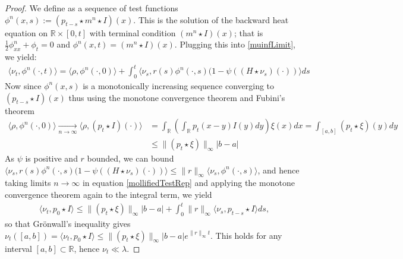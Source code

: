 \documentclass{article}
\newcommand{\B}[1]{\mathbb{#1}}
\begin{document}
\begin{proof}
    We define as a sequence of test functions $\phi^n(x,s):=(p_{t-s}\star m^n \star I)(x)$. This is the solution of the backward heat equation on $\B{R}\times [0,t]$ with terminal condition $(m^n\star I)(x)$; that is $\frac12\phi^n_{xx}+\phi_t=0$ and $\phi^n(x,t)=(m^n\star I)(x)$. Plugging this into \eqref{muinfLimit}, we yield:
    \begin{align}\label{mollifiedTestRep}
        \langle \nu_t,\phi^n(\cdot,t)\rangle = \langle \rho, \phi^n(\cdot,0)\rangle + \int_0^t \langle \nu_s, r(s)\phi^n(\cdot,s)(1-\psi((H\star \nu_s)(\cdot))\rangle ds
    \end{align}
    Now since $\phi^n(x,s)$ is a monotonically increasing sequence converging to $(p_{t-s}\star I)(x)$ thus %
    using the monotone convergence theorem and Fubini's theorem
    \begin{align*} \langle \rho, \phi^n(\cdot,0)\rangle \xrightarrow[n\to\infty]{} \langle \rho, (p_t \star I)(\cdot)\rangle &= \int_{\B{R}} \left(\int_{\B{R}} p_t(x-y)I(y)dy\right) \xi(x)dx = \int_{[a,b]} (p_t\star \xi)(y)dy \\
    &\leq \|(p_t\star \xi)\|_\infty |b-a|\end{align*}
    As $\psi$ is positive and $r$ bounded, we can bound $\langle \nu_s, r(s)\phi^n(\cdot,s)(1-\psi((H\star \nu_s)(\cdot))\rangle \leq \|r\|_\infty \langle \nu_s, \phi^n(\cdot,s)\rangle$, and hence taking limits $n\to\infty$ in equation \eqref{mollifiedTestRep} and applying the monotone convergence theorem again to the integral term, we yield
    \begin{align*}
        \langle \nu_t, p_0 \star I \rangle \leq \|(p_t \star \xi)\|_\infty |b-a| + \int_0^t \|r\|_\infty \langle \nu_s, p_{t-s}\star I\rangle ds,
    \end{align*}
    so that Gr\"{o}nwall's inequality gives $\nu_t([a,b])=\langle \nu_t,p_0\star I\rangle \leq \|(p_t\star \xi)\|_\infty |b-a| e^{\|r\|_\infty t}$. This holds for any interval $[a,b]\subset \B{R}$, hence $\nu_t\ll \lambda$. 
\end{proof}
\end{document}
